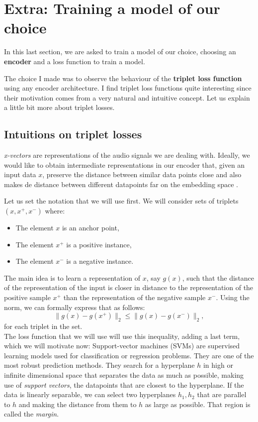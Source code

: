 \documentclass[a4paper]{article}
\newcommand{\norm}[1]{\lVert #1 \rVert}
\newcommand{\ps}{x^+}
\newcommand{\ns}{x^-}
\begin{document}
\section{Extra: Training a model of our choice}
In this last section, we are asked to train a model of our choice, choosing an \textbf{encoder} and a loss function to train a model.

The choice I made was to observe the behaviour of the \textbf{triplet loss function} using any encoder architecture. I find triplet loss functions quite interesting since their motivation comes from a very natural and intuitive concept. Let us explain a little bit more about triplet losses.

\subsection{Intuitions on triplet losses}

\emph{x-vectors} are representations of the audio signals we are dealing with. Ideally, we would like to obtain intermediate representations in our encoder that, given an input data $x$, preserve the distance between similar data points close and also makes de distance between different datapoints far on the embedding space \cite{Sohn2016ImprovedDM}.

Let us set the notation that we will use first. We will consider sets of triplets $(x,\ps,\ns)$ where:
\begin{itemize}
\item The element $x$ is an anchor point,
\item The element $\ps$ is a positive instance,
\item The element $\ns$ is a negative instance.
\end{itemize}

The main idea is to learn a representation of $x$, say $g(x)$, such that the distance of the representation of the input is closer in distance to the representation of the positive sample $\ps$ than the representation of the negative sample $\ns$. Using the norm, we can formally express that as follows:
$$
\norm{g(x) - g(\ps)}_2 \leq \norm{g(x) - g(\ns)}_2,
$$
for each triplet in the set.\\

The loss function that we will use will use this inequality, adding a last term, which we will motivate now: Support-vector machines (SVMs) are supervised learning models used for classification or regression problems. They are one of the most robust prediction methods. They search for a hyperplane $h$ in high or infinite dimensional space that separates the data as much as possible, making use of \emph{support vectors}, the datapoints that are closest to the hyperplane. If the data is linearly separable, we can select two hyperplanes $h_1,h_2$ that are parallel to $h$ and making the distance from them to $h$ as large as possible. That region is called the \emph{margin}.\\
\end{document}
